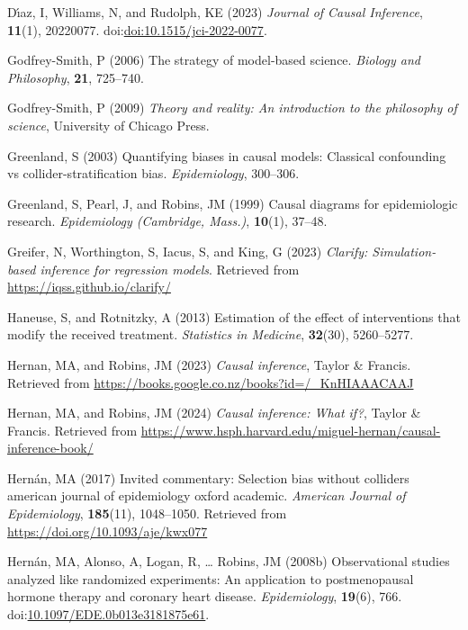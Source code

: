 \documentclass[
  single column]{article}
\newlength{\cslhangindent}
\newenvironment{CSLReferences}[2] %
 {\begin{list}{}{%
  \setlength{\itemindent}{0pt}
  \setlength{\leftmargin}{0pt}
  \setlength{\parsep}{0pt}
  \ifodd #1
   \setlength{\leftmargin}{\cslhangindent}
   \setlength{\itemindent}{-1\cslhangindent}
  \fi
  \setlength{\itemsep}{#2\baselineskip}}}
 {\end{list}}
\begin{document}
\begin{CSLReferences}{1}{0}
Dı́az, I, Williams, N, and Rudolph, KE (2023) \emph{Journal of Causal
Inference}, \textbf{11}(1), 20220077.
doi:\href{https://doi.org/doi:10.1515/jci-2022-0077}{doi:10.1515/jci-2022-0077}.

Godfrey-Smith, P (2006) The strategy of model-based science.
\emph{Biology and Philosophy}, \textbf{21}, 725--740.

Godfrey-Smith, P (2009) \emph{Theory and reality: An introduction to the
philosophy of science}, University of Chicago Press.

Greenland, S (2003) Quantifying biases in causal models: Classical
confounding vs collider-stratification bias. \emph{Epidemiology},
300--306.

Greenland, S, Pearl, J, and Robins, JM (1999) Causal diagrams for
epidemiologic research. \emph{Epidemiology (Cambridge, Mass.)},
\textbf{10}(1), 37--48.

Greifer, N, Worthington, S, Iacus, S, and King, G (2023) \emph{Clarify:
Simulation-based inference for regression models}. Retrieved from
\url{https://iqss.github.io/clarify/}

Haneuse, S, and Rotnitzky, A (2013) Estimation of the effect of
interventions that modify the received treatment. \emph{Statistics in
Medicine}, \textbf{32}(30), 5260--5277.

Hernan, MA, and Robins, JM (2023) \emph{Causal inference}, Taylor \&
Francis. Retrieved from
\url{https://books.google.co.nz/books?id=/_KnHIAAACAAJ}

Hernan, MA, and Robins, JM (2024) \emph{Causal inference: What if?},
Taylor \& Francis. Retrieved from
\url{https://www.hsph.harvard.edu/miguel-hernan/causal-inference-book/}

Hernán, MA (2017) Invited commentary: Selection bias without colliders
\textbar{} american journal of epidemiology \textbar{} oxford academic.
\emph{American Journal of Epidemiology}, \textbf{185}(11), 1048--1050.
Retrieved from \url{https://doi.org/10.1093/aje/kwx077}

Hernán, MA, Alonso, A, Logan, R, \ldots{} Robins, JM (2008b)
Observational studies analyzed like randomized experiments: An
application to postmenopausal hormone therapy and coronary heart
disease. \emph{Epidemiology}, \textbf{19}(6), 766.
doi:\href{https://doi.org/10.1097/EDE.0b013e3181875e61}{10.1097/EDE.0b013e3181875e61}.


\end{CSLReferences}
\end{document}
